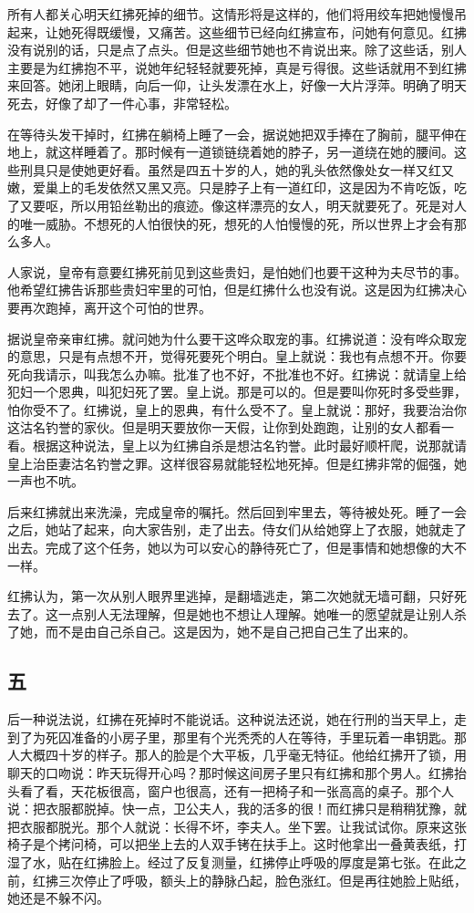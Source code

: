 所有人都关心明天红拂死掉的细节。这情形将是这样的，他们将用绞车把她慢慢吊起来，让她死得既缓慢，又痛苦。这些细节已经向红拂宣布，问她有何意见。红拂没有说别的话，只是点了点头。但是这些细节她也不肯说出来。除了这些话，别人主要是为红拂抱不平，说她年纪轻轻就要死掉，真是亏得很。这些话就用不到红拂来回答。她闭上眼睛，向后一仰，让头发漂在水上，好像一大片浮萍。明确了明天死去，好像了却了一件心事，非常轻松。 

在等待头发干掉时，红拂在躺椅上睡了一会，据说她把双手捧在了胸前，腿平伸在地上，就这样睡着了。那时候有一道锁链绕着她的脖子，另一道绕在她的腰间。这些刑具只是使她更好看。虽然是四五十岁的人，她的乳头依然像处女一样又红又嫩，爱巢上的毛发依然又黑又亮。只是脖子上有一道红印，这是因为不肯吃饭，吃了又要呕，所以用铅丝勒出的痕迹。像这样漂亮的女人，明天就要死了。死是对人的唯一威胁。不想死的人怕很快的死，想死的人怕慢慢的死，所以世界上才会有那么多人。 

人家说，皇帝有意要红拂死前见到这些贵妇，是怕她们也要干这种为夫尽节的事。他希望红拂告诉那些贵妇牢里的可怕，但是红拂什么也没有说。这是因为红拂决心要再次跑掉，离开这个可怕的世界。 

据说皇帝亲审红拂。就问她为什么要干这哗众取宠的事。红拂说道：没有哗众取宠的意思，只是有点想不开，觉得死要死个明白。皇上就说：我也有点想不开。你要死向我请示，叫我怎么办嘛。批准了也不好，不批准也不好。红拂说：就请皇上给犯妇一个恩典，叫犯妇死了罢。皇上说。那是可以的。但是要叫你死时多受些罪，怕你受不了。红拂说，皇上的恩典，有什么受不了。皇上就说：那好，我要治治你这沽名钓誉的家伙。但是明天要放你一天假，让你到处跑跑，让别的女人都看一看。根据这种说法，皇上以为红拂自杀是想沽名钓誉。此时最好顺杆爬，说那就请皇上治臣妻沽名钓誉之罪。这样很容易就能轻松地死掉。但是红拂非常的倔强，她一声也不吭。 

后来红拂就出来洗澡，完成皇帝的嘱托。然后回到牢里去，等待被处死。睡了一会之后，她站了起来，向大家告别，走了出去。侍女们从给她穿上了衣服，她就走了出去。完成了这个任务，她以为可以安心的静待死亡了，但是事情和她想像的大不一样。 

红拂认为，第一次从别人眼界里逃掉，是翻墙逃走，第二次她就无墙可翻，只好死去了。这一点别人无法理解，但是她也不想让人理解。她唯一的愿望就是让别人杀了她，而不是由自己杀自己。这是因为，她不是自己把自己生了出来的。 

\subsection{五} 

后一种说法说，红拂在死掉时不能说话。这种说法还说，她在行刑的当天早上，走到了为死囚准备的小房子里，那里有个光秃秃的人在等待，手里玩着一串钥匙。那人大概四十岁的样子。那人的脸是个大平板，几乎毫无特征。他给红拂开了锁，用聊天的口吻说：昨天玩得开心吗？那时候这间房子里只有红拂和那个男人。红拂抬头看了看，天花板很高，窗户也很高，还有一把椅子和一张高高的桌子。那个人说：把衣服都脱掉。快一点，卫公夫人，我的活多的很！而红拂只是稍稍犹豫，就把衣服都脱光。那个人就说：长得不坏，李夫人。坐下罢。让我试试你。原来这张椅子是个拷问椅，可以把坐上去的人双手铐在扶手上。这时他拿出一叠黄表纸，打湿了水，贴在红拂脸上。经过了反复测量，红拂停止呼吸的厚度是第七张。在此之前，红拂三次停止了呼吸，额头上的静脉凸起，脸色涨红。但是再往她脸上贴纸，她还是不躲不闪。 

